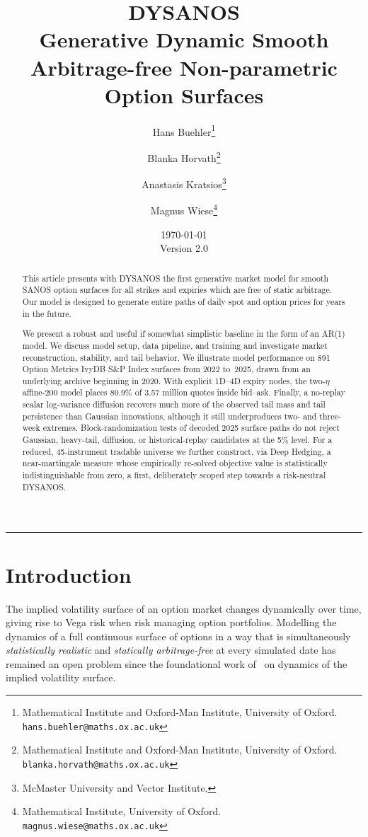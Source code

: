 \documentclass[11pt,a4paper]{article}
\title{%
  \textbf{DYSANOS}\\[6pt]
  \large 
Generative Dynamic Smooth Arbitrage-free Non-parametric Option Surfaces
}
\author{%
  Hans Buehler\thanks{%
    Mathematical Institute and Oxford-Man Institute,
    University of Oxford.
    \texttt{hans.buehler@maths.ox.ac.uk}}
  \and
  Blanka Horvath\thanks{%
    Mathematical Institute and Oxford-Man Institute,
    University of Oxford. \texttt{blanka.horvath@maths.ox.ac.uk}}
  \and
  Anastasis Kratsios\thanks{%
    McMaster University and Vector Institute.}
    \and
  Magnus Wiese\thanks{%
    Mathematical Institute,
    University of Oxford. \texttt{magnus.wiese@maths.ox.ac.uk}}
}
\date{\today\\Version 2.0}
\begin{document}
\maketitle


\begin{abstract}
This article presents with DYSANOS the first generative market model 
for smooth SANOS option surfaces for all strikes and expiries which are
free of static arbitrage. 
Our model is designed to generate entire paths of daily spot and option prices for years
in the future. 

We present a robust and useful if somewhat simplistic baseline in the form of an AR(1) model.
We discuss model setup, data pipeline, and training and investigate market
reconstruction, stability, and tail behavior. We illustrate model performance
on 891 Option Metrics IvyDB S\&P Index surfaces from 2022 to~2025, drawn from
an underlying archive beginning in 2020.
With explicit 1D--4D expiry nodes, the two-$\eta$ affine-200 model places
80.9\% of 3.57 million quotes inside bid--ask.
Finally, a no-replay scalar log-variance diffusion recovers much more of the
observed tail mass and tail persistence than Gaussian innovations, although it
still underproduces two- and three-week extremes.  Block-randomization tests of
decoded 2025 surface paths do not reject Gaussian, heavy-tail, diffusion, or
historical-replay candidates at the 5\% level.
For a reduced, 45-instrument tradable universe we further construct, via
Deep Hedging, a near-martingale measure whose empirically re-solved objective
value is statistically indistinguishable from zero, a first, deliberately
scoped step towards a risk-neutral DYSANOS.
\end{abstract}

\tableofcontents
\bigskip\hrule\bigskip


\section{Introduction}
\label{sec:intro}

The implied volatility surface of an option market changes dynamically over time, giving rise to
Vega risk when risk managing option portfolios.
Modelling the dynamics of a full continuous surface of options
in a way that is simultaneously \emph{statistically realistic} and \emph{statically
arbitrage-free} at every simulated date has remained an open problem since the
foundational work of~\cite{ContVol} on dynamics of the implied volatility surface.
\end{document}

